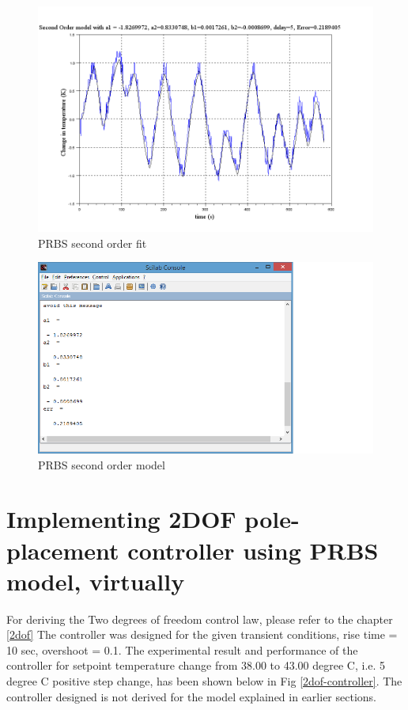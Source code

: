 \begin{figure}
\centering
\includegraphics[width=0.7\linewidth]{prbs/prbs-2-fit.png}
\caption{PRBS second order fit}
\label{prbs-2-fit}
\end{figure}

\begin{figure}
\centering
\includegraphics[width=0.7\linewidth]{prbs/prbs-2-model.png}
\caption{PRBS second order model}
\label{prbs-2-model}
\end{figure}


\section{Implementing 2DOF pole-placement controller using PRBS model, virtually}

For deriving the Two degrees of freedom control law, please refer to the chapter \ref{2dof}
The controller was designed for the given transient conditions, rise time = 10 sec, overshoot = 0.1. The experimental result and performance of the controller for setpoint temperature change from 38.00 to 43.00 degree C, i.e. 5 degree C positive step change, has been shown below in Fig \ref{2dof-controller}. The controller designed is not derived for the model explained in earlier sections.

